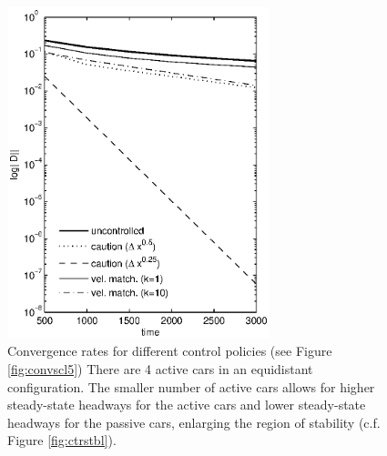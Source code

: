 \documentclass[10pt,twocolumn]{article}
\theoremstyle{ss}
\newcommand{\lm}{\fontfamily{\sfdefault}\selectfont}
\begin{document}
\begin{figure}[!h]
\lm
\begin{center}
\includegraphics[width=3in]{convscl25}
\end{center}
\caption{ \label{fig:convscl25} Convergence rates for different control policies (see Figure \ref{fig:convscl5}) There are 4 active cars in an equidistant configuration. The smaller number of active cars allows for higher steady-state headways for the active cars and lower steady-state headways for the passive cars, enlarging the region of stability (c.f. Figure \ref{fig:ctrstbl}).}
\end{figure}
\end{document}

